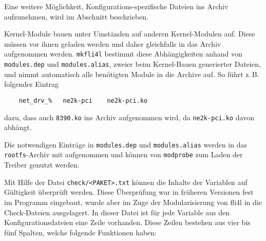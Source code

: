 Eine weitere Möglichkeit, Konfigurations-spezifische Dateien ins Archiv
aufzunehmen, wird im Abschnitt
 beschrieben.


Kernel-Module bauen unter Umständen auf anderen Kernel-Modulen
auf. Diese müssen vor ihnen geladen werden und daher gleichfalls in
das Archiv aufgenommen werden. \texttt{mkfli4l} bestimmt diese
Abhängigkeiten anhand von \texttt{modules.dep} und \texttt{modules.alias},
zweier beim Kernel-Bauen generierter Dateien, und nimmt automatisch
alle benötigten Module in die Archive auf. So führt z.\,B. folgender
Eintrag

\begin{example}
\begin{verbatim}
    net_drv_%   ne2k-pci    ne2k-pci.ko
\end{verbatim}
\end{example}

dazu, dass auch \texttt{8390.ko} ins Archiv aufgenommen wird, da
\texttt{ne2k-pci.ko} davon abhängt.

Die notwendigen Einträge in \texttt{modules.dep} und \texttt{modules.alias}
werden in das \texttt{rootfs}-Archiv mit aufgenommen und können von
\texttt{modprobe} zum Laden der Treiber genutzt werden.


Mit Hilfe der Datei \texttt{check/<PAKET>.txt} können die Inhalte der Variablen auf Gültigkeit
überprüft werden. Diese Überprüfung war in früheren Versionen fest im
Programm  eingebaut, wurde aber im Zuge der Modularisierung von
fli4l in die Check-Dateien ausgelagert. In dieser Datei ist für jede
Variable aus den Konfigurationsdateien eine Zeile vorhanden. Diese Zeilen
bestehen aus vier bis fünf Spalten, welche folgende Funktionen haben:

